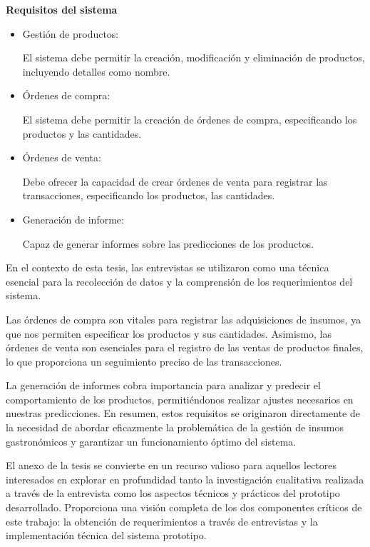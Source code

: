 \vspace{1\baselineskip}
\textbf{Requisitos del sistema}
 \begin{itemize}

  \item Gestión de productos: 
  
  El sistema debe permitir la creación, modificación y eliminación de productos, incluyendo detalles como nombre.

  \item Órdenes de compra: 
  
  El sistema debe permitir la creación de órdenes de compra, especificando los productos y las cantidades.

  \item Órdenes de venta:
  
  Debe ofrecer la capacidad de crear órdenes de venta para registrar las transacciones, especificando los productos, las cantidades.
  
  \item Generación de informe: 
  
  Capaz de generar informes sobre las predicciones de los productos.
  
 \end{itemize}

 En el contexto de esta tesis, las entrevistas se utilizaron como una técnica esencial para la recolección de datos y la comprensión de los requerimientos del sistema.

 \vspace{1\baselineskip}
 Las órdenes de compra son vitales para registrar las adquisiciones de insumos, ya que nos permiten especificar los productos y sus cantidades. Asimismo, las órdenes de venta son esenciales para el registro de las ventas de productos finales, lo que proporciona un seguimiento preciso de las transacciones.

 \vspace{1\baselineskip}
La generación de informes cobra importancia para analizar y predecir el comportamiento de los productos, permitiéndonos realizar ajustes necesarios en nuestras predicciones. En resumen, estos requisitos se originaron directamente de la necesidad de abordar eficazmente la problemática de la gestión de insumos gastronómicos y garantizar un funcionamiento óptimo del sistema.
 
\vspace{1\baselineskip}
 El anexo de la tesis se convierte en un recurso valioso para aquellos lectores interesados en explorar en profundidad tanto la investigación cualitativa realizada a través de la entrevista como los aspectos técnicos y prácticos del prototipo desarrollado. Proporciona una visión completa de los dos componentes críticos de este trabajo: la obtención de requerimientos a través de entrevistas y la implementación técnica del sistema prototipo.


 
